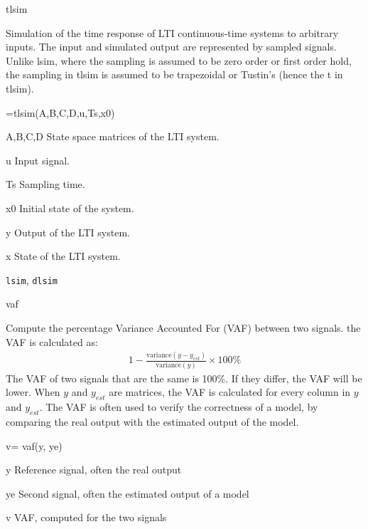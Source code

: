 \documentclass{book}
\newcommand{\lsim}{\texttt{lsim}}
\newcommand{\dlsim}{\texttt{dlsim}}
\begin{document}
\begin{command}{tlsim}
\begin{purpose}
  Simulation of the time response of LTI continuous-time systems to
  arbitrary inputs.  The input and simulated output are represented by
  sampled signals. Unlike lsim, where the sampling is assumed to be
  zero order or first order hold, the sampling in tlsim is assumed to
  be trapezoidal or Tustin's (hence the t in tlsim).
\end{purpose}
\begin{syntax}
  [y,x]=tlsim(A,B,C,D,u,Ts,x0)
\end{syntax}
\begin{inputs}
\item[A,B,C,D] State space matrices of the LTI system.
\item[u] Input signal.
\item[Ts] Sampling time.
\item[x0] Initial state of the system.
\end{inputs}
\begin{outputs}
\item[y] Output of the LTI system.
\item[x] State of the LTI system.
\end{outputs}
\begin{seealso}
{\lsim}, {\dlsim}
\end{seealso}
\end{command}%


\begin{command}{vaf}

\begin{purpose}
Compute the percentage Variance Accounted For (VAF) between
two signals. the VAF is calculated as:
\begin{eqnarray*} 
1-\frac{\mbox{variance}(y-y_{est})}{\mbox{variance}(y)} \times 100\%
\end{eqnarray*}
The VAF of two signals that are the same is 100\%. If they differ,
the VAF will be lower.  When $y$ and $y_{est}$ are matrices, the
VAF is calculated for every column in $y$ and $y_{est}$.  The VAF
is often used to verify the correctness of a model, by comparing the
real output with the estimated output of the model.
\end{purpose}

\begin{syntax}
v= vaf(y, ye)
\end{syntax}

\begin{inputs}
\item[y] Reference signal, often the real output
\item[ye] Second signal, often the estimated output of a model
\end{inputs}

\begin{outputs}
\item[v] VAF, computed for the two signals
\end{outputs}

\begin{seealso}
\mbox{}
\end{seealso}
\end{command}%
\end{document}
